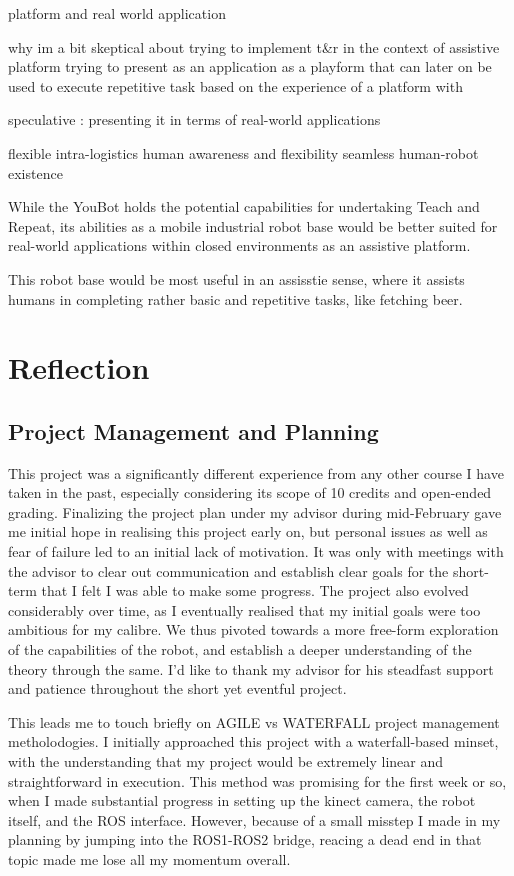 \documentclass[a4paper, 12pt]{article}
\begin{document}
    platform and real world application

    why im a bit skeptical about 
    trying to implement t\&r in the context of assistive platform 
    trying to present as an application as a playform that can later on be used to execute repetitive task based on the experience of a platform with 

    speculative : presenting it in terms of real-world applications

    flexible intra-logistics
    human awareness and flexibility 
    seamless human-robot existence

    While the YouBot holds the potential capabilities for undertaking Teach and Repeat, its abilities as a mobile industrial robot base would be better suited for real-world applications within closed environments as an assistive platform. 

    This robot base would be most useful in an assisstie  sense, where it assists humans in completing rather basic and repetitive tasks, like fetching beer. 

    \pagebreak

    \section{Reflection}
    \subsection{Project Management and Planning}
    This project was a significantly different experience from any other course I have taken in the past, especially considering its scope of 10 credits and open-ended grading. Finalizing the project plan under my advisor during mid-February gave me initial hope in realising this project early on, but personal issues as well as fear of failure led to an initial lack of motivation. It was only with meetings with the advisor to clear out communication and establish clear goals for the short-term that I felt I was able to make some progress. The project also evolved considerably over time, as I eventually realised that my initial goals were too ambitious for my calibre. We thus pivoted towards a more free-form exploration of the capabilities of the robot, and establish a deeper understanding of the theory through the same. I'd like to thank my advisor for his steadfast support and patience throughout the short yet eventful project. 

    This leads me to touch briefly on AGILE vs WATERFALL project management metholodogies. I initially approached this project with a waterfall-based minset, with the understanding that my project would be extremely linear and straightforward in execution. This method was promising for the first week or so, when I made substantial progress in setting up the kinect camera, the robot itself, and the ROS interface. However, because of a small misstep I made in my planning by jumping into the ROS1-ROS2 bridge, reacing a dead end in that topic made me lose all my momentum overall. 
    
\end{document}
